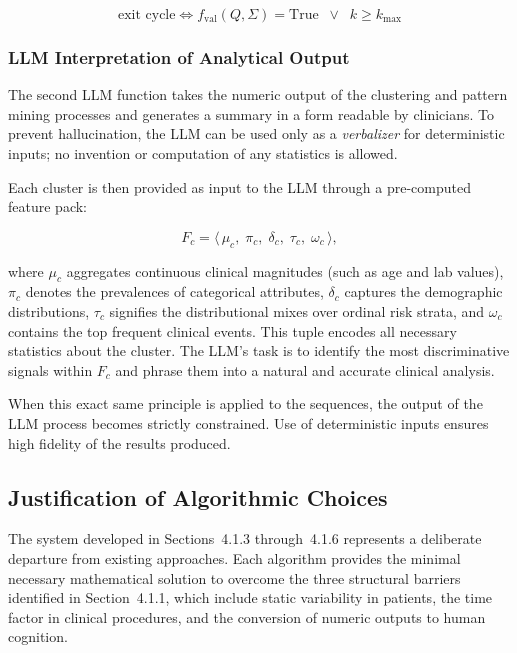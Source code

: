 \begin{equation}
    \text{exit cycle} \iff f_{\mathrm{val}}(Q,\Sigma) = \mathrm{True} \;\;\lor\;\; k \ge k_{\max}
    \label{eq:exit}
\end{equation}

\subsubsection*{LLM Interpretation of Analytical Output}

The second LLM function takes the numeric output of the clustering and pattern mining processes and generates a summary in a form readable by clinicians. To prevent hallucination, the LLM can be used only as a \emph{verbalizer} for deterministic inputs; no invention or computation of any statistics is allowed.

Each cluster is then provided as input to the LLM through a pre-computed feature pack:

\begin{equation}
    F_c = \langle\, \mu_c,\; \pi_c,\; \delta_c,\; \tau_c,\; \omega_c \,\rangle,
    \label{eq:feature_pack}
\end{equation}

where $\mu_c$ aggregates continuous clinical magnitudes (such as age and lab values), $\pi_c$ denotes the prevalences of categorical attributes, $\delta_c$ captures the demographic distributions, $\tau_c$ signifies the distributional mixes over ordinal risk strata, and $\omega_c$ contains the top frequent clinical events. This tuple encodes all necessary statistics about the cluster. The LLM's task is to identify the most discriminative signals within $F_c$ and phrase them into a natural and accurate clinical analysis.

When this exact same principle is applied to the sequences, the output of the LLM process becomes strictly constrained. Use of deterministic inputs ensures high fidelity of the results produced.
\subsection{Justification of Algorithmic Choices}

The system developed in Sections~4.1.3 through~4.1.6 represents a deliberate departure from existing approaches. Each algorithm provides the minimal necessary mathematical solution to overcome the three structural barriers identified in Section~4.1.1, which include static variability in patients, the time factor in clinical procedures, and the conversion of numeric outputs to human cognition.

